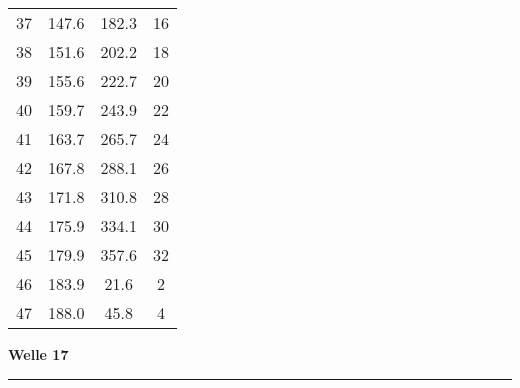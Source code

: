 \documentclass[10pt, a4paper]{article}
\begin{document}
\begin{center}
\begin{tabular}{c|c|c|c}
		37 & 147.6 & 182.3 & 16 \\
		38 & 151.6 & 202.2 & 18 \\
		39 & 155.6 & 222.7 & 20 \\
		40 & 159.7 & 243.9 & 22 \\
		41 & 163.7 & 265.7 & 24 \\
		42 & 167.8 & 288.1 & 26 \\
		43 & 171.8 & 310.8 & 28 \\
		44 & 175.9 & 334.1 & 30 \\
		45 & 179.9 & 357.6 & 32 \\
		46 & 183.9 & 21.6 & 2 \\
		47 & 188.0 & 45.8 & 4 \\
	\end{tabular}
\end{center}
\newpage
\centerline{{\bf Welle 17} }
\rule{1.0\textwidth}{0.5mm}
\end{document}
